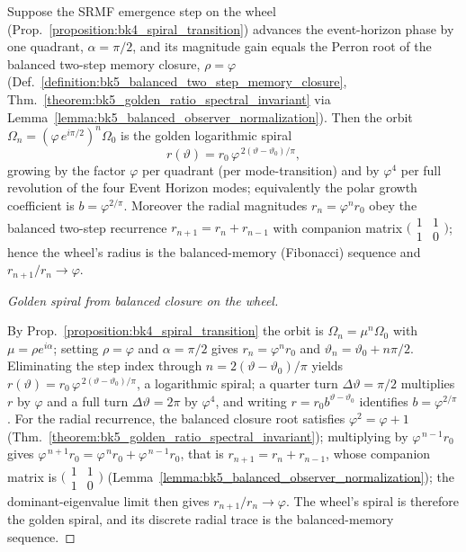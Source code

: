 \begin{theorem}
\label{theorem:bk4_golden_event_horizon_spiral}
Suppose the SRMF emergence step on the wheel
(Prop.~\ref{proposition:bk4_spiral_transition}) advances the event-horizon phase by
one quadrant, $\alpha=\pi/2$, and its magnitude gain equals the Perron root of the
balanced two-step memory closure, $\rho=\varphi$
(Def.~\ref{definition:bk5_balanced_two_step_memory_closure},
Thm.~\ref{theorem:bk5_golden_ratio_spectral_invariant} via
Lemma~\ref{lemma:bk5_balanced_observer_normalization}). Then the orbit
$\Omega_n=(\varphi\,e^{i\pi/2})^{n}\Omega_0$ is the golden logarithmic spiral
\[
r(\vartheta)=r_0\,\varphi^{\,2(\vartheta-\vartheta_0)/\pi},
\]
growing by the factor $\varphi$ per quadrant (per mode-transition) and by
$\varphi^{4}$ per full revolution of the four Event Horizon modes; equivalently the
polar growth coefficient is $b=\varphi^{2/\pi}$. Moreover the radial magnitudes
$r_n=\varphi^{n}r_0$ obey the balanced two-step recurrence
$r_{n+1}=r_n+r_{n-1}$ with companion matrix
$\big(\begin{smallmatrix}1&1\\1&0\end{smallmatrix}\big)$; hence the wheel's radius is
the balanced-memory (Fibonacci) sequence and $r_{n+1}/r_n\to\varphi$.
\end{theorem}

\begin{proof}[Golden spiral from balanced closure on the wheel]
\label{proof:bk4_golden_event_horizon_spiral}
\leavevmode

By Prop.~\ref{proposition:bk4_spiral_transition} the orbit is
$\Omega_n=\mu^{n}\Omega_0$ with $\mu=\rho e^{i\alpha}$; setting $\rho=\varphi$ and
$\alpha=\pi/2$ gives $r_n=\varphi^{n}r_0$ and
$\vartheta_n=\vartheta_0+n\pi/2$. Eliminating the step index through
$n=2(\vartheta-\vartheta_0)/\pi$ yields
$r(\vartheta)=r_0\,\varphi^{\,2(\vartheta-\vartheta_0)/\pi}$, a logarithmic spiral;
a quarter turn $\Delta\vartheta=\pi/2$ multiplies $r$ by $\varphi$ and a full turn
$\Delta\vartheta=2\pi$ by $\varphi^{4}$, and writing $r=r_0 b^{\vartheta-\vartheta_0}$
identifies $b=\varphi^{2/\pi}$. For the radial recurrence, the balanced closure root
satisfies $\varphi^{2}=\varphi+1$
(Thm.~\ref{theorem:bk5_golden_ratio_spectral_invariant}); multiplying by
$\varphi^{\,n-1}r_0$ gives $\varphi^{\,n+1}r_0=\varphi^{\,n}r_0+\varphi^{\,n-1}r_0$,
that is $r_{n+1}=r_n+r_{n-1}$, whose companion matrix is
$\big(\begin{smallmatrix}1&1\\1&0\end{smallmatrix}\big)$
(Lemma~\ref{lemma:bk5_balanced_observer_normalization}); the dominant-eigenvalue
limit then gives $r_{n+1}/r_n\to\varphi$. The wheel's spiral is therefore the golden
spiral, and its discrete radial trace is the balanced-memory sequence.
\end{proof}

